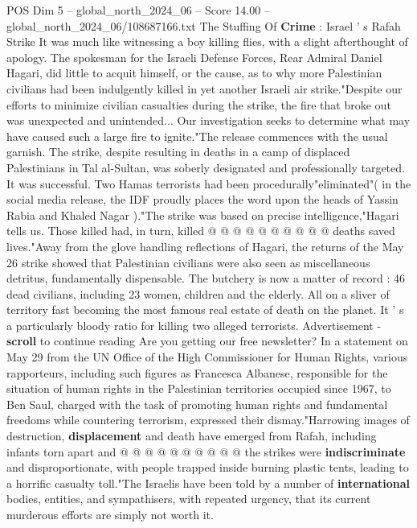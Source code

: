 \begin{textsample}{POS Dim 5 – global\_north\_2024\_06 – Score 14.00 – global\_north\_2024\_06/108687166.txt}  \label{ex:f5_pos_320}
The Stuffing Of \textbf{Crime} : Israel ' s Rafah Strike It was much like witnessing a boy killing flies, with a slight afterthought of apology.
The spokesman for the Israeli Defense Forces, Rear Admiral Daniel Hagari, did little to acquit himself, or the cause, as to why more Palestinian civilians had been indulgently killed in yet another Israeli air strike."Despite our efforts to minimize civilian casualties during the strike, the fire that broke out was unexpected and unintended...
Our investigation seeks to determine what may have caused such a large fire to ignite."The release commences with the usual garnish.
The strike, despite resulting in deaths in a camp of displaced Palestinians in Tal al-Sultan, was soberly designated and professionally targeted.
It was successful.
Two Hamas terrorists had been procedurally"eliminated"( in the social media release, the IDF proudly places the word upon the heads of Yassin Rabia and Khaled Nagar )."The strike was based on precise intelligence,"Hagari tells us.
Those killed had, in turn, killed @ @ @ @ @ @ @ @ @ @ deaths saved lives."Away from the glove handling reflections of Hagari, the returns of the May 26 strike showed that Palestinian civilians were also seen as miscellaneous detritus, fundamentally dispensable.
The butchery is now a matter of record : 46 dead civilians, including 23 women, children and the elderly.
All on a sliver of territory fast becoming the most famous real estate of death on the planet.
It ' s a particularly bloody ratio for killing two alleged terrorists.
Advertisement - \textbf{scroll} to continue reading Are you getting our free newsletter?
In a statement on May 29 from the UN Office of the High Commissioner for Human Rights, various rapporteurs, including such figures as Francesca Albanese, responsible for the situation of human rights in the Palestinian territories occupied since 1967, to Ben Saul, charged with the task of promoting human rights and fundamental freedoms while countering terrorism, expressed their dismay."Harrowing images of destruction, \textbf{displacement} and death have emerged from Rafah, including infants torn apart and @ @ @ @ @ @ @ @ @ @ the strikes were \textbf{indiscriminate} and disproportionate, with people trapped inside burning plastic tents, leading to a horrific casualty toll."The Israelis have been told by a number of \textbf{international} bodies, entities, and sympathisers, with repeated urgency, that its current murderous efforts are simply not worth it.

\end{textsample}
